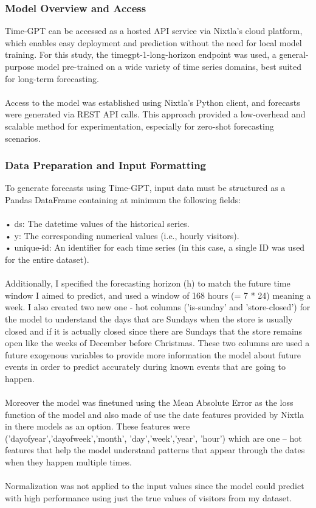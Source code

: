 \documentclass{article}
\begin{document}
\subsubsection{Model Overview and Access}
Time-GPT can be accessed as a hosted API service via Nixtla’s cloud platform, which enables easy deployment and prediction without the need for local model training. For this study, the timegpt-1-long-horizon endpoint was used, a general-purpose model pre-trained on a wide variety of time series domains, best suited for long-term forecasting.\\
\\
Access to the model was established using Nixtla’s Python client, and forecasts were generated via REST API calls. This approach provided a low-overhead and scalable method for experimentation, especially for zero-shot forecasting scenarios.


\subsubsection{Data Preparation and Input Formatting}
To generate forecasts using Time-GPT, input data must be structured as a Pandas DataFrame containing at minimum the following fields:\\
\\
•	ds: The datetime values of the historical series.\\
•	y: The corresponding numerical values (i.e., hourly visitors).\\
•	unique-id: An identifier for each time series (in this case, a single ID was used for the entire dataset).\\
\\
Additionally, I specified the forecasting horizon (h) to match the future time window I aimed to predict, and used a window of  168 hours (= 7 * 24)  meaning a week. I also created two new one - hot columns ('is-sunday' and 'store-closed') for the model to understand the days that are Sundays when the store is usually closed and if it is actually closed since there are Sundays that the store remains open like the weeks of December before Christmas. These two columns are used a future exogenous variables to provide more information the model about future events in order to predict accurately during known events that are going to happen.\\
\\
Moreover the model was finetuned using the Mean Absolute Error as the loss function of the model and also made of use the date features provided by Nixtla in there models as an option. These features were ('dayofyear','dayofweek','month', 'day','week','year', 'hour') which are one – hot features that help the model understand patterns that appear through the dates when they happen multiple times.\\
\\
Normalization was not applied to the input values since the model could predict with high performance using just the true values of visitors from my dataset.\\
\end{document}
